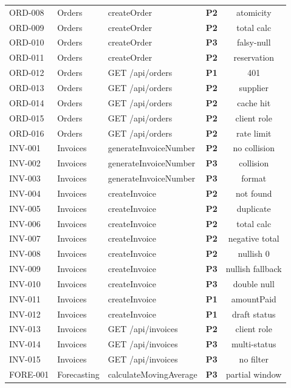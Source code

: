 \documentclass[12pt,a4paper]{report}
\newcommand{\pone}{\textbf{\color{p1red}P1}}
\newcommand{\ptwo}{\textbf{\color{p2orange}P2}}
\newcommand{\pthree}{\textbf{\color{p3blue}P3}}
\begin{document}
\begin{center}
\begin{longtable}{llllc}
  ORD-008  & Orders & createOrder & \ptwo & atomicity \\
  ORD-009  & Orders & createOrder & \ptwo & total calc \\
  ORD-010  & Orders & createOrder & \pthree & falsy-null \\
  ORD-011  & Orders & createOrder & \ptwo & reservation \\
  ORD-012  & Orders & GET /api/orders & \pone & 401 \\
  ORD-013  & Orders & GET /api/orders & \ptwo & supplier \\
  ORD-014  & Orders & GET /api/orders & \ptwo & cache hit \\
  ORD-015  & Orders & GET /api/orders & \ptwo & client role \\
  ORD-016  & Orders & GET /api/orders & \ptwo & rate limit \\
  INV-001  & Invoices & generateInvoiceNumber & \ptwo & no collision \\
  INV-002  & Invoices & generateInvoiceNumber & \pthree & collision \\
  INV-003  & Invoices & generateInvoiceNumber & \pthree & format \\
  INV-004  & Invoices & createInvoice & \ptwo & not found \\
  INV-005  & Invoices & createInvoice & \ptwo & duplicate \\
  INV-006  & Invoices & createInvoice & \ptwo & total calc \\
  INV-007  & Invoices & createInvoice & \ptwo & negative total \\
  INV-008  & Invoices & createInvoice & \ptwo & nullish 0 \\
  INV-009  & Invoices & createInvoice & \pthree & nullish fallback \\
  INV-010  & Invoices & createInvoice & \pthree & double null \\
  INV-011  & Invoices & createInvoice & \pone & amountPaid \\
  INV-012  & Invoices & createInvoice & \pone & draft status \\
  INV-013  & Invoices & GET /api/invoices & \ptwo & client role \\
  INV-014  & Invoices & GET /api/invoices & \pthree & multi-status \\
  INV-015  & Invoices & GET /api/invoices & \pthree & no filter \\
  FORE-001 & Forecasting & calculateMovingAverage & \pthree & partial window \\

\end{longtable}
\end{center}
\end{document}
